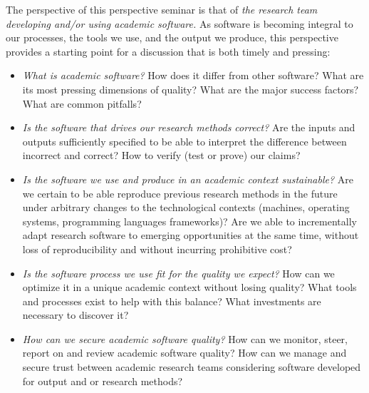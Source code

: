 \documentclass[a4paper,UKenglish]{dagman}
\begin{document}
The perspective of this perspective seminar is that of \emph{the research team developing and/or using academic software.} 
As software is becoming integral to our processes, the tools we use, and the output we produce, this perspective provides a starting point for a discussion that is both timely and pressing:

\begin{itemize}
\item \emph{What is academic software?} How does it differ from other software? What are its most pressing dimensions of quality? What are the major success factors? What are common pitfalls?
\item \emph{Is the software that drives our research methods correct?} Are the inputs and outputs sufficiently specified to be able to interpret the difference between incorrect and correct? How to verify (test or prove) our claims?
\item \emph{Is the software we use and produce in an academic context sustainable?}
Are we certain to be able reproduce previous research methods in the future under arbitrary changes to the technological contexts (machines, operating systems, programming languages frameworks)? Are we able to incrementally adapt research software to emerging opportunities at the same time, without loss of reproducibility and without incurring prohibitive cost?
\item \emph{Is the software process we use fit for the quality we expect?} How can we optimize it in a unique academic context without losing quality? What tools and processes exist to help with this balance? What investments are necessary to discover it?
\item \emph{How can we secure academic software quality?} How can we monitor, steer, report on and review academic software quality? How can we manage and secure trust between academic research teams considering software developed for output and or research methods?

\end{itemize}
\end{document}
